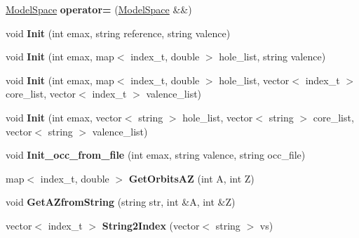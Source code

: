 \begin{DoxyCompactItemize}
\item 
\hyperlink{classModelSpace}{Model\+Space} {\bfseries operator=} (\hyperlink{classModelSpace}{Model\+Space} \&\&)\hypertarget{classModelSpace_ab1d44cc22730d233506daa4f6e83187c}{}\label{classModelSpace_ab1d44cc22730d233506daa4f6e83187c}

\item 
void {\bfseries Init} (int emax, string reference, string valence)\hypertarget{classModelSpace_a50e2397b86081bb986f60bb22ac15020}{}\label{classModelSpace_a50e2397b86081bb986f60bb22ac15020}

\item 
void {\bfseries Init} (int emax, map$<$ index\+\_\+t, double $>$ hole\+\_\+list, string valence)\hypertarget{classModelSpace_ae37ad0f7907e5393f69beb389c3736dd}{}\label{classModelSpace_ae37ad0f7907e5393f69beb389c3736dd}

\item 
void {\bfseries Init} (int emax, map$<$ index\+\_\+t, double $>$ hole\+\_\+list, vector$<$ index\+\_\+t $>$ core\+\_\+list, vector$<$ index\+\_\+t $>$ valence\+\_\+list)\hypertarget{classModelSpace_a316219d35698eb2e5b35d99c5e5773b7}{}\label{classModelSpace_a316219d35698eb2e5b35d99c5e5773b7}

\item 
void {\bfseries Init} (int emax, vector$<$ string $>$ hole\+\_\+list, vector$<$ string $>$ core\+\_\+list, vector$<$ string $>$ valence\+\_\+list)\hypertarget{classModelSpace_aff2a521ffbd96d20412e7bfa58de7cf6}{}\label{classModelSpace_aff2a521ffbd96d20412e7bfa58de7cf6}

\item 
void {\bfseries Init\+\_\+occ\+\_\+from\+\_\+file} (int emax, string valence, string occ\+\_\+file)\hypertarget{classModelSpace_a6fbccf2bd4f740e12277df88679c0a97}{}\label{classModelSpace_a6fbccf2bd4f740e12277df88679c0a97}

\item 
map$<$ index\+\_\+t, double $>$ {\bfseries Get\+Orbits\+AZ} (int A, int Z)\hypertarget{classModelSpace_a71eecf8dbad7e5ad556efc6691219305}{}\label{classModelSpace_a71eecf8dbad7e5ad556efc6691219305}

\item 
void {\bfseries Get\+A\+Zfrom\+String} (string str, int \&A, int \&Z)\hypertarget{classModelSpace_a561d4416270383383ccbd6285c25e67e}{}\label{classModelSpace_a561d4416270383383ccbd6285c25e67e}

\item 
vector$<$ index\+\_\+t $>$ {\bfseries String2\+Index} (vector$<$ string $>$ vs)\hypertarget{classModelSpace_a8df2a8a7972907c36423f184c47e5da3}{}\label{classModelSpace_a8df2a8a7972907c36423f184c47e5da3}


\end{DoxyCompactItemize}

